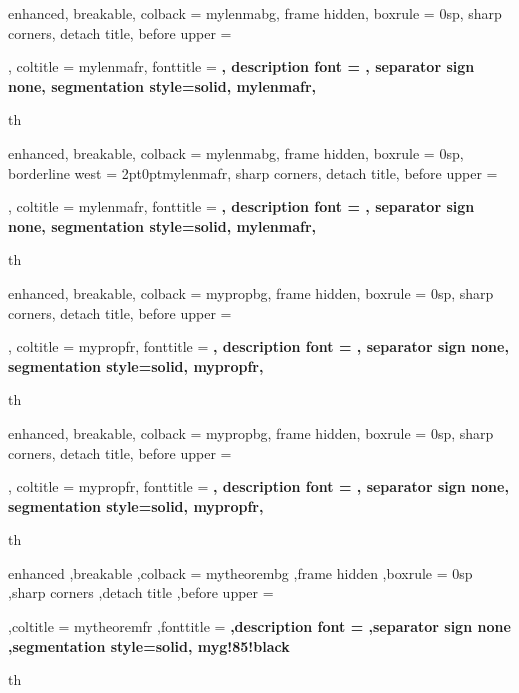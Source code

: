 
{%
	enhanced,
	breakable,
	colback = mylenmabg,
	frame hidden,
	boxrule = 0sp,
	sharp corners,
	detach title,
	before upper = \tcbtitle\par\bigskip,
	coltitle = mylenmafr,
	fonttitle = \bfseries\sffamily,
	description font = \mdseries,
	separator sign none,
	segmentation style={solid, mylenmafr},
}
{th}

{%
	enhanced,
	breakable,
	colback = mylenmabg,
	frame hidden,
	boxrule = 0sp,
	borderline west = {2pt}{0pt}{mylenmafr},
	sharp corners,
	detach title,
	before upper = \tcbtitle\par\bigskip,
	coltitle = mylenmafr,
	fonttitle = \bfseries\sffamily,
	description font = \mdseries,
	separator sign none,
	segmentation style={solid, mylenmafr},
}
{th}



{%
	enhanced,
	breakable,
	colback = mypropbg,
	frame hidden,
	boxrule = 0sp,
	sharp corners,
	detach title,
	before upper = \tcbtitle\par\bigskip,
	coltitle = mypropfr,
	fonttitle = \bfseries\sffamily,
	description font = \mdseries,
	separator sign none,
	segmentation style={solid, mypropfr},
}
{th}

{%
	enhanced,
	breakable,
	colback = mypropbg,
	frame hidden,
	boxrule = 0sp,
	sharp corners,
	detach title,
	before upper = \tcbtitle\par\bigskip,
	coltitle = mypropfr,
	fonttitle = \bfseries\sffamily,
	description font = \mdseries,
	separator sign none,
	segmentation style={solid, mypropfr},
}
{th}



{%
	enhanced
	,breakable
	,colback = mytheorembg
	,frame hidden
	,boxrule = 0sp
	,sharp corners
	,detach title
	,before upper = \tcbtitle\par\bigskip
	,coltitle = mytheoremfr
	,fonttitle = \bfseries\sffamily
	,description font = \mdseries
	,separator sign none
	,segmentation style={solid, myg!85!black}
}
{th}


